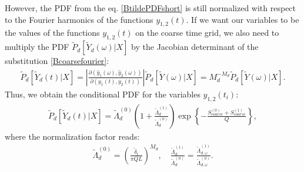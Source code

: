 \documentclass{article}
\begin{document}
However, the PDF from the eq$.$ \eqref{BtildePDFshort} is still normalized with respect to the Fourier harmonics of the functions $y_{1,2}(t)$. If we want our variables to be the values of the functions $y_{1,2}(t)$ on the coarse time grid, we also need to multiply the PDF $\tilde{P}_{d}[\tilde{Y}_{d}(\omega)|X]$ by the Jacobian determinant of the substitution \eqref{Bcoarsefourier}: 
\begin{eqnarray}
    \tilde{P}_{d}[\tilde{Y}_{d}(t)|X] = \left|\frac{\partial(\hat{y}_{1}(\omega), \hat{y}_{2}(\omega))}{\partial(y_{1}(t),y_{2}(t))}\right| \tilde{P}_{d}[\tilde{Y}(\omega)|X] = M_{d}^{-M_{d}} \tilde{P}_{d}[\tilde{Y}(\omega)|X]. 
\end{eqnarray}
Thus, we obtain the conditional PDF for the variables $y_{1,2}(t_{i})$: 
\begin{eqnarray}\label{BtildePDFshortt}
    \tilde{P}_{d}[\tilde{Y}_{d}(t)|X] = \tilde{\Lambda}_{d}^{(0)}\left(1 + \frac{\tilde{\Lambda}_{d}^{(1)}}{\tilde{\Lambda}_{d}^{(0)}}\right)\exp\left\{-\frac{S_{coarse}^{(0)} + S_{coarse}^{(1)}}{Q}\right\},
\end{eqnarray}
where the normalization factor reads: 
\begin{eqnarray}\label{BLambdadt}
    \tilde{\Lambda}_{d}^{(0)} = \left(\frac{\tilde{\delta}_{t}}{\pi Q L}\right)^{M_{d}}, \quad \frac{\tilde{\Lambda}_{d}^{(1)}}{\tilde{\Lambda}_{d}^{(0)}} = \frac{\tilde{\Lambda}_{d,\omega}^{(1)}}{\tilde{\Lambda}_{d,\omega}^{(0)}}.
\end{eqnarray}
\end{document}
